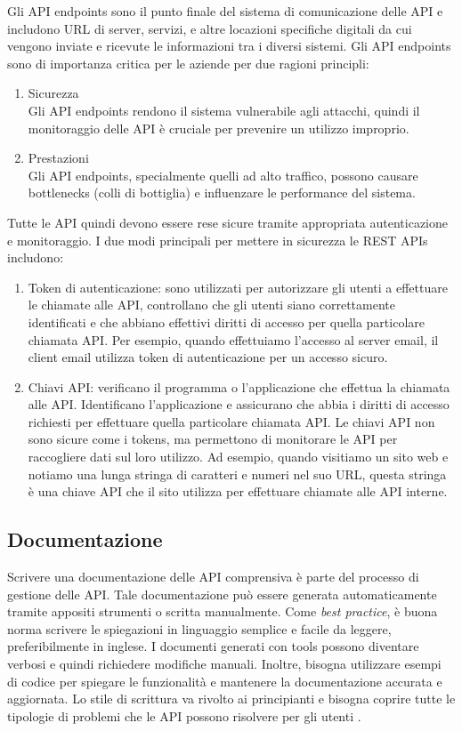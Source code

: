 Gli API endpoints sono il punto finale del sistema di comunicazione delle API e includono URL di server, servizi, e altre locazioni specifiche digitali da cui vengono inviate e ricevute le informazioni tra i diversi sistemi. Gli API endpoints sono di importanza critica per le aziende per due ragioni principli:
\begin{enumerate}
    \item Sicurezza\\
    Gli API endpoints rendono il sistema vulnerabile agli attacchi, quindi il monitoraggio delle API è cruciale per prevenire un utilizzo improprio.
    \item Prestazioni\\
    Gli API endpoints, specialmente quelli ad alto traffico, possono causare bottlenecks (colli di bottiglia) e influenzare le performance del sistema.
\end{enumerate}

Tutte le API quindi devono essere rese sicure tramite appropriata autenticazione e monitoraggio. I due modi principali per mettere in sicurezza le REST APIs includono:
\begin{enumerate}
    \item Token di autenticazione: sono utilizzati per autorizzare gli utenti a effettuare le chiamate alle API, controllano che gli utenti siano correttamente identificati e che abbiano effettivi diritti di accesso per quella particolare chiamata API. Per esempio, quando effettuiamo l'accesso al server email, il client email utilizza token di autenticazione per un accesso sicuro.
    \item Chiavi API: verificano il programma o l'applicazione che effettua la chiamata alle API. Identificano l'applicazione e assicurano che abbia i diritti di accesso richiesti per effettuare quella particolare chiamata API. Le chiavi API non sono sicure come i tokens, ma permettono di monitorare le API per raccogliere dati sul loro utilizzo. Ad esempio, quando visitiamo un sito web e notiamo una lunga stringa di caratteri e numeri nel suo URL, questa stringa è una chiave API che il sito utilizza per effettuare chiamate alle API interne.
\end{enumerate}

\subsection{Documentazione}
Scrivere una documentazione delle API comprensiva è parte del processo di gestione delle API. Tale documentazione può essere generata automaticamente tramite appositi strumenti o scritta manualmente. Come \textit{best practice}, è buona norma scrivere le spiegazioni in linguaggio semplice e facile da leggere, preferibilmente in inglese. I documenti generati con tools possono diventare verbosi e quindi richiedere modifiche manuali. Inoltre, bisogna utilizzare esempi di codice per spiegare le funzionalità e mantenere la documentazione accurata e aggiornata. Lo stile di scrittura va rivolto ai principianti e bisogna coprire tutte le tipologie di problemi che le API possono risolvere per gli utenti \cite{API_AWS}.

